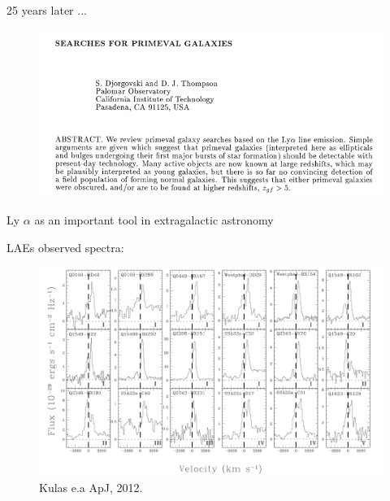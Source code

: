 \documentclass{beamer}
\begin{document}
\begin{frame}
\LARGE{25 years later ...}
\end{frame}

\begin{frame}
\begin{figure}
\includegraphics[scale=0.4]{Figures/DJT.png}
\end{figure}
\end{frame}

\begin{frame}{Ly $\alpha$ as an important tool in extragalactic astronomy}

\end{frame}


\begin{frame}{LAEs observed spectra:}
\begin{figure}
\includegraphics[scale=0.33]{Figures/kulas.png}
\caption*{Kulas e.a ApJ, 2012.}
\end{figure}
\end{frame}
\end{document}
